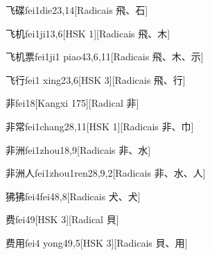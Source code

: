 \begin{entry}{飞碟}{fei1die2}{3,14}[Radicais ⾶、⽯]
\end{entry}

\begin{entry}{飞机}{fei1ji1}{3,6}[HSK 1][Radicais ⾶、⽊]
\end{entry}

\begin{entry}{飞机票}{fei1ji1 piao4}{3,6,11}[Radicais ⾶、⽊、⽰]
\end{entry}

\begin{entry}{飞行}{fei1 xing2}{3,6}[HSK 3][Radicais ⾶、⾏]
\end{entry}

\begin{entry}{非}{fei1}{8}[Kangxi 175][Radical ⾮]
\end{entry}

\begin{entry}{非常}{fei1chang2}{8,11}[HSK 1][Radicais ⾮、⼱]
\end{entry}

\begin{entry}{非洲}{fei1zhou1}{8,9}[Radicais ⾮、⽔]
\end{entry}

\begin{entry}{非洲人}{fei1zhou1ren2}{8,9,2}[Radicais ⾮、⽔、⼈]
\end{entry}

\begin{entry}{狒狒}{fei4fei4}{8,8}[Radicais ⽝、⽝]
\end{entry}

\begin{entry}{费}{fei4}{9}[HSK 3][Radical ⾙]
\end{entry}

\begin{entry}{费用}{fei4 yong4}{9,5}[HSK 3][Radicais ⾙、⽤]
\end{entry}

